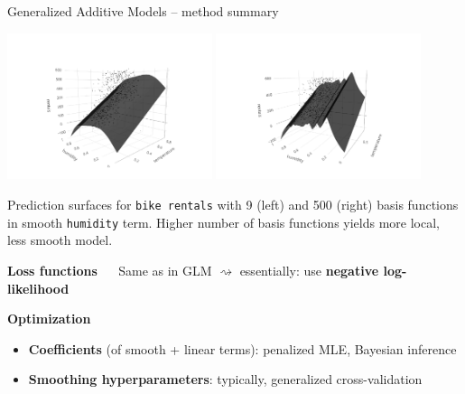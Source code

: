 \documentclass[11pt,compress,t,notes=noshow, xcolor=table]{beamer}
\newcommand{\highlight}[1]{\textcolor{hlcol}{\textbf{#1}}}
\begin{document}
\begin{frame2}{Generalized Additive Models -- method summary}
\begin{minipage}{0.65\textwidth}
\includegraphics[width=0.45\textwidth, trim=0 0 80 80, clip]{
figure/gam_bike_pred}
\includegraphics[width=0.45\textwidth, trim=80 0 0 80, clip]{
figure/gam_bike_pred_wiggly}
\hfill
\end{minipage}
\begin{minipage}{0.3\textwidth}
\tiny \raggedright
Prediction surfaces for \texttt{bike rentals} with 9 (left) and 500 (right)
basis functions in smooth \texttt{humidity} term.
Higher number of basis functions yields more local, less smooth model.
\end{minipage}

\medskip

\highlight{Loss functions} ~~ Same as in GLM $\rightsquigarrow$ essentially:
use \textbf{negative log-likelihood}

\medskip

\highlight{Optimization}
\begin{itemize}
  \item \textbf{Coefficients} (of smooth + linear terms):
  penalized MLE, Bayesian inference
  \item \textbf{Smoothing hyperparameters}: typically, generalized
  cross-validation
\end{itemize}

\end{frame2}
\end{document}
